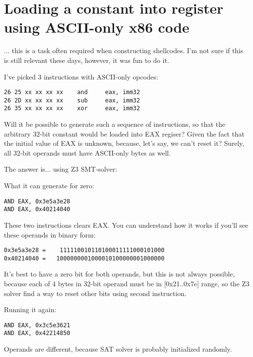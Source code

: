 \section{Loading a constant into register using ASCII-only x86 code}

... this is a task often required when constructing shellcodes.
I'm not sure if this is still relevant these days, however, it was fun to do it.

I've picked 3 instructions with ASCII-only opcodes:

\begin{lstlisting}
26 25 xx xx xx xx    and     eax, imm32
26 2D xx xx xx xx    sub     eax, imm32
26 35 xx xx xx xx    xor     eax, imm32
\end{lstlisting}

Will it be possible to generate such a sequence of instructions, so that the arbitrary 32-bit constant would be loaded
into EAX regiser?
Given the fact that the initial value of EAX is unknown, because, let's say, we can't reset it?
Surely, all 32-bit operands must have ASCII-only bytes as well.

The answer is... using Z3 SMT-solver:



What it can generate for zero:

\begin{lstlisting}
AND EAX, 0x3e5a3e28
AND EAX, 0x40214040
\end{lstlisting}

These two instructions clears EAX. You can understand how it works if you'll see these operands in binary form:

\begin{lstlisting}
0x3e5a3e28 =    111110010110100011111000101000
0x40214040 =   1000000001000010100000001000000
\end{lstlisting}

It's best to have a zero bit for both operands, but this is not always possible, because each of 4 bytes in 32-bit operand
must be in [0x21..0x7e] range, so the Z3 solver find a way to reset other bits using second instruction.

Running it again:

\begin{lstlisting}
AND EAX, 0x3c5e3621
AND EAX, 0x42214850
\end{lstlisting}

Operands are different, because SAT solver is probably initialized randomly.

